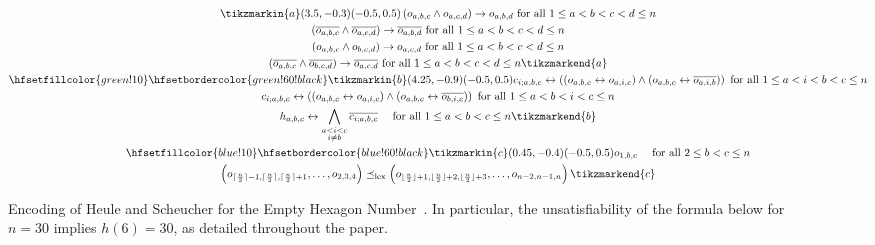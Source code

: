 \begin{figure}
  \caption{Encoding of Heule and Scheucher for the Empty Hexagon Number~\cite{emptyHexagonNumber}. In particular, the unsatisfiability of the formula below for $n=30$ implies $h(6) = 30$, as detailed throughout the paper.}
  \label{fig:full-encoding}
\begin{framed}
  \begin{spreadlines}{16pt} 
\begin{gather}
\tikzmarkin{a}(3.5,-0.3)(-0.5,0.5)
  \left(\orvar_{a, b, c} \land \orvar_{a, c, d}\right) \rightarrow \orvar_{a, b, d} \text{ for all } 1 \leq a < b < c < d \leq n\\
  \left(\ov{\orvar_{a, b, c}} \land \ov{\orvar_{a, c, d}}\right) \rightarrow \ov{\orvar_{a, b, d}} \text{ for all } 1 \leq a < b < c < d \leq n\\
  \left(\orvar_{a, b, c} \land \orvar_{b, c, d}\right) \rightarrow \orvar_{a, c, d} \text{ for all } 1 \leq a < b < c < d \leq n\\
  \left(\ov{\orvar_{a, b, c}} \land \ov{\orvar_{b, c, d}}\right) \rightarrow \ov{\orvar_{a, c, d}} \text{ for all } 1 \leq a < b < c < d \leq n \tikzmarkend{a}\\
\hfsetfillcolor{green!10}
\hfsetbordercolor{green!60!black}
\tikzmarkin{b}(4.25,-0.9)(-0.5,0.5)
  \cvar_{i; a,b, c} \leftrightarrow \left(\left(\orvar_{a,b,c} \leftrightarrow \orvar_{a, i, c}  \right) \land \left(\orvar_{a,b,c} \leftrightarrow \ov{\orvar_{a, i, b}}  \right)\right) \text{ for all } 1 \leq a < i < b < c \leq n\\ 
  \cvar_{i; a,b, c} \leftrightarrow \left(\left(\orvar_{a,b,c} \leftrightarrow \orvar_{a, i, c}  \right) \land \left(\orvar_{a,b,c} \leftrightarrow \ov{\orvar_{b, i, c}}  \right)\right) \text{ for all } 1 \leq a < b < i < c \leq n\\ 
  \hvar_{a, b, c} \leftrightarrow \bigwedge_{\substack{a < i < c\\ i \neq b}} \ov{\cvar_{i; a,b,c}} \quad \text{ for all } 1 \leq a < b < c \leq n
  \tikzmarkend{b}\\ 
\hfsetfillcolor{blue!10}
\hfsetbordercolor{blue!60!black}
\tikzmarkin{c}(0.45,-0.4)(-0.5,0.5)
    \orvar_{1, b, c} \quad \text{ for all } 2 \leq b < c \leq n \label{eq:constraint-8}\\
    \left(\orvar_{\lceil \frac{n}{2} \rceil -1, \lceil \frac{n}{2} \rceil,\lceil \frac{n}{2} \rceil+1}, \ldots, \orvar_{2,3,4} \right) \preceq_{\text{lex}} \left(\orvar_{\lfloor \frac{n}{2}\rfloor +1,  \lfloor \frac{n}{2}\rfloor +2, \lfloor \frac{n}{2}\rfloor +3}, \ldots, \orvar_{n-2, n-1, n} \right)\tikzmarkend{c}\label{eq:constraint-9}\\ 

\end{gather}
\end{spreadlines}
\end{framed}
\end{figure}
